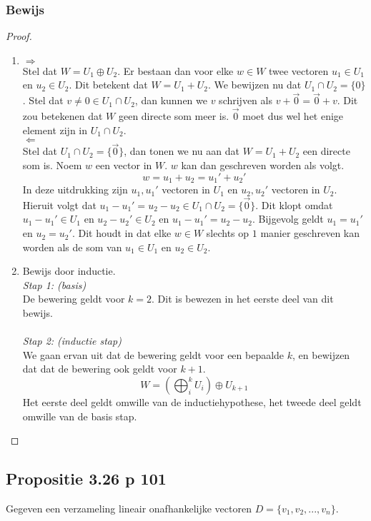 \documentclass[lineaire_algebra_oplossingen.tex]{subfiles}
\begin{document}
\subsubsection*{Bewijs}
\begin{proof}~
\begin{enumerate}
\item
\emph{$\Rightarrow$}\\
Stel dat $W = U_1 \oplus U_2$.
Er bestaan dan voor elke $w\in W$ twee vectoren $u_1\in U_1$ en $u_2 \in U_2$.
Dit betekent dat $W = U_1+U_2$. We bewijzen nu dat $U_1\cap U_2 = \{0\}$.
Stel dat $v \neq 0 \in U_1\cap U_2$, dan kunnen we $v$ schrijven als $v+\vec{0}=\vec{0}+v$.
Dit zou betekenen dat $W$ geen directe som meer is.
$\vec{0}$ moet dus wel het enige element zijn in $U_1\cap U_2$.\\

\emph{$\Leftarrow$}\\
Stel dat $U_1\cap U_2 = \{\vec{0}\}$, dan tonen we nu aan dat $W = U_1+U_2$ een directe som is.
Noem $w$ een vector in $W$. $w$ kan dan geschreven worden als volgt.
\[
w = u_1+u_2=u_1'+u_2'
\]
In deze uitdrukking zijn $u_1,u_1'$ vectoren in $U_1$ en $u_2,u_2'$ vectoren in $U_2$.
Hieruit volgt dat $u_1-u_1'=u_2-u_2 \in U_1\cap U_2 = \{\vec{0}\}$.
Dit klopt omdat $u_1-u_1' \in U_1$ en $u_2-u_2' \in U_2$ en $u_1-u_1'=u_2-u_2$.
Bijgevolg geldt $u_1 = u_1'$ en $u_2=u_2'$.
Dit houdt in dat elke $w \in W$ slechts op $1$ manier geschreven kan worden als de som van $u_1\in U_1$ en $u_2\in U_2$.

\item
Bewijs door inductie.\\
\emph{Stap 1: (basis)}\\
De bewering geldt voor $k=2$. Dit is bewezen in het eerste deel van dit bewijs.\\\\
\emph{Stap 2: (inductie stap)}\\
We gaan ervan uit dat de bewering geldt voor een bepaalde $k$, en bewijzen dat dat de bewering ook geldt voor $k+1$.
\[
W = (\bigoplus_i^k U_i) \oplus U_{k+1}
\]
Het eerste deel geldt omwille van de inductiehypothese, het tweede deel geldt omwille van de basis stap.
\end{enumerate}
\end{proof}


\subsection{Propositie 3.26 p 101} %
\label{3.26}
Gegeven een verzameling lineair onafhankelijke vectoren $D= \{v_1,v_2,...,v_n\}$.
\end{document}
